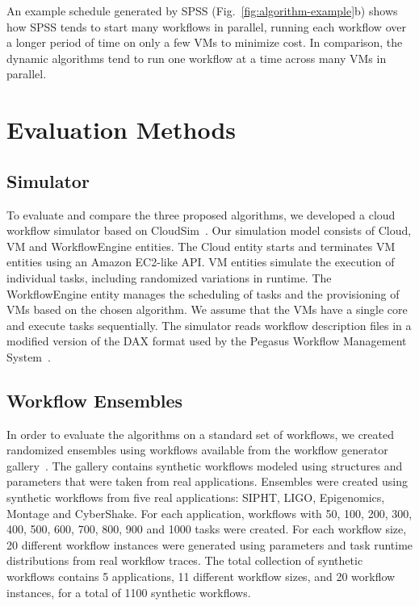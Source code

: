 \documentclass[conference]{IEEEtran}
\begin{document}
An example schedule generated by SPSS (Fig.~\ref{fig:algorithm-example}b)
shows how SPSS tends to start many workflows in parallel, running each workflow
over a longer period of time on only a few VMs to minimize cost. In comparison,
the dynamic algorithms tend to run one workflow at a time across many VMs in
parallel.


\section{Evaluation Methods}
\label{sec:performance}


\subsection{Simulator}

To evaluate and compare the three proposed algorithms, we developed a cloud
workflow simulator based on CloudSim~\cite{Calheiros2011}. Our simulation model
consists of Cloud, VM and WorkflowEngine entities. The Cloud entity starts and
terminates VM entities using an Amazon EC2-like API. VM entities simulate the
execution of individual tasks, including randomized variations in runtime. The
WorkflowEngine entity manages the scheduling of tasks and the provisioning of 
VMs based on the chosen algorithm. We assume that the VMs have a single core
and execute tasks sequentially. 
The simulator reads workflow description files in
a modified version of the DAX format used by the Pegasus Workflow Management
System~\cite{Deelman2005}. 


\subsection{Workflow Ensembles}
\label{sec:ensembles}


In order to evaluate the algorithms on a standard set of workflows, we created
randomized ensembles using workflows available from the workflow generator
gallery~\cite{WorkflowGenerator}. The
gallery contains synthetic workflows modeled using structures and parameters
that were taken from real applications. Ensembles were created using synthetic
workflows from five real applications: SIPHT, LIGO, Epigenomics, Montage and
CyberShake. For each application, workflows with 50, 100, 200, 300,
400, 500, 600, 700, 800, 900 and 1000 tasks were created. For each workflow
size, 20 different workflow instances were generated using parameters and task
runtime distributions from real workflow traces. The total collection of
synthetic workflows contains 5 applications, 11 different workflow sizes, and 20
workflow instances, for a total of 1100 synthetic workflows.
\end{document}
